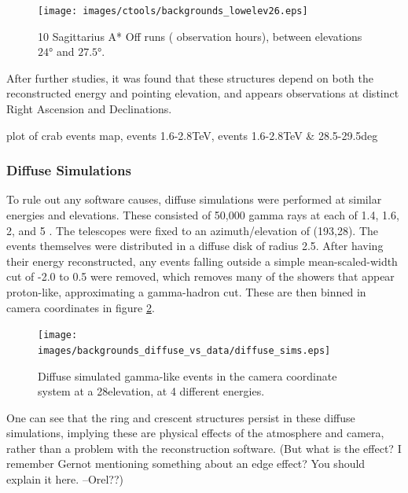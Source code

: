     \begin{figure}[ht]
      \begin{center}
        \texttt{[image: images/ctools/backgrounds\_lowelev26.eps]}
        \caption[CTOOLS Background at 26\degree Elevation]{10 Sagittarius A* Off runs ( observation hours), between elevations $ \ang{24} $ and $ \ang{27.5} $. }\label{fig:back_lowelev26}
      \end{center}
    \end{figure}
  
  After further studies, it was found that these structures depend on both the reconstructed energy and pointing elevation, and appears observations at distinct Right Ascension and Declinations.
  
  plot of crab events map, events 1.6-2.8TeV, events 1.6-2.8TeV & 28.5-29.5deg
  
  

  \subsubsection{Diffuse Simulations}\label{subsubsec:diffusesims}
    To rule out any software causes, diffuse simulations were performed at similar energies and elevations.
    These consisted of 50,000 gamma rays at each of 1.4, 1.6, 2, and 5 \TeV.
    The telescopes were fixed to an azimuth/elevation of (193\degree,28\degree).
    The events themselves were distributed in a diffuse disk of radius 2.5\degree.
    After having their energy reconstructed, any events falling outside a simple mean-scaled-width cut of -2.0 to 0.5 were removed, which removes many of the showers that appear proton-like, approximating a gamma-hadron cut.
    These are then binned in camera coordinates in figure \ref{fig:back_simdiffuse}.

    \begin{figure}[ht]
      \begin{center}
        \texttt{[image: images/backgrounds\_diffuse\_vs\_data/diffuse\_sims.eps]}
        \caption[Diffuse Simulated Backgrounds]{Diffuse simulated gamma-like events in the camera coordinate system at a 28\degree elevation, at 4 different energies.}\label{fig:back_simdiffuse}
      \end{center}
    \end{figure}

    One can see that the ring and crescent structures persist in these diffuse simulations, implying these are physical effects of the atmosphere and camera, rather than a problem with the reconstruction software.
    (But what is the effect? I remember Gernot mentioning something about an edge effect? You should explain it here. --Orel??)

